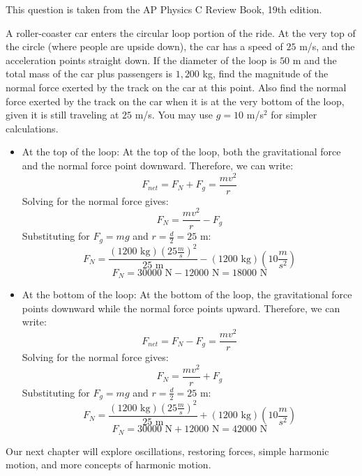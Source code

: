 \begin{Exercise}[title={Roller Coaster Loop}, label=rollercoaster]
  This question is taken from the AP Physics C Review Book, 19th edition.

  A roller-coaster car enters the circular loop portion of the ride. At the very top of the circle (where people are upside down), the car has a speed of $25$ m/s, and the acceleration points straight down. If the diameter of the loop is $50$ m and the total mass of the car plus passengers is $1,200$ kg, find the magnitude of the normal force exerted by the track on the car at this point. Also find the normal force exerted by the track on the car when it is at the very bottom of the loop, given it is still traveling at $25$ m/s. You may use $g=10$ m/s$^2$ for simpler calculations.
\end{Exercise}

\begin{Answer}[ref=rollercoaster]
  \begin{itemize}
    \item At the top of the loop:
          At the top of the loop, both the gravitational force and the normal force point downward. Therefore, we can write:
          $$F_{net} = F_N + F_g = \frac{mv^2}{r}$$
          Solving for the normal force gives:
          $$F_N = \frac{mv^2}{r} - F_g$$
          Substituting for $F_g = mg$ and $r = \frac{d}{2} = 25$ m:
          $$F_N = \frac{(1200 \text{ kg})(25 \frac{m}{s})^2}{25 \text{ m}} - (1200 \text{ kg})(10 \frac{m}{s^2})$$
          $$F_N = 30000 \text{ N} - 12000 \text{ N} = 18000 \text{ N}$$

    \item At the bottom of the loop:
          At the bottom of the loop, the gravitational force points downward while the normal force points upward. Therefore, we can write:
          $$F_{net} = F_N - F_g = \frac{mv^2}{r}$$
          Solving for the normal force gives:
          $$F_N = \frac{mv^2}{r} + F_g$$
          Substituting for $F_g = mg$ and $r = \frac{d}{2} = 25$ m:
          $$F_N = \frac{(1200 \text{ kg})(25 \frac{m}{s})^2}{25 \text{ m}} + (1200 \text{ kg})(10 \frac{m}{s^2})$$
          $$F_N = 30000 \text{ N} + 12000 \text{ N} = 42000 \text{ N}$$
  \end{itemize}
\end{Answer}
Our next chapter will explore oscillations, restoring forces, simple harmonic motion, and more concepts of harmonic motion.

